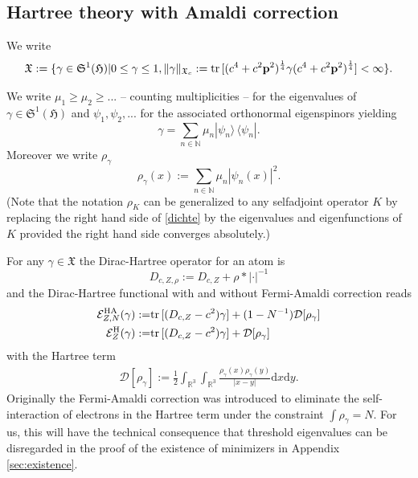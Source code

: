 \documentclass[a4paper]{amsart}
\def\tr{{\rm tr \,}}
\def\R{\mathbb{R}}
\def\bp{{\mathbf p}}
\def\cD{\mathcal{D}}
\def\gH{\mathfrak{H}}
\def\gS{\mathfrak{S}}
\def\gX{\mathfrak{X}}
\def\rd{\mathrm{d}}
\def\nz{{\mathbb N}}
\begin{document}
\subsection{Hartree  theory with Amaldi correction} 
We write
\begin{equation}
\gX:=\{\gamma\in\gS^1({\gH})| 0\leq\gamma\leq1, \|\gamma\|_{\gX_c}:=\tr[(c^4+c^2\bp^2)^\frac14\gamma(c^4+c^2\bp^2)^\frac14]<\infty\}.
\end{equation}

We write $\mu_1\geq\mu_2\geq... $ -- counting multiplicities
-- for the eigenvalues of $\gamma\in \gS^1(\gH)$ and $\psi_1,\psi_2,...$ for
the associated orthonormal eigenspinors yielding
\begin{equation}
  \gamma=\sum_{n\in \nz}\mu_n |\psi_n \rangle\,\langle \psi_n|.
\end{equation}
Moreover we write $\rho_\gamma$
\begin{equation}
  \label{dichte}
\rho_{\gamma}(x):=\sum_{n\in\nz}\mu_n |\psi_n(x)|^2.
\end{equation}
(Note that the notation $\rho_K$ can be generalized to any selfadjoint
operator $K$ by replacing the right hand side of \eqref{dichte} by the
eigenvalues and eigenfunctions of $K$ provided the right hand side
converges absolutely.)

For any $\gamma\in\gX$ the Dirac-Hartree operator for an atom is
\begin{equation}
    D_{c,Z,\rho}:= D_{c,Z}+\rho*|\cdot|^{-1}
\end{equation}
and the Dirac-Hartree functional with and without Fermi-Amaldi
correction reads 
\begin{align}
  \mathcal{E}^{\rm HA}_{Z,N}(\gamma):=&\tr[(D_{c,Z}-c^2)\gamma]+(1-N^{-1})\cD[\rho_{\gamma}]\\
  \mathcal{E}^{\rm H}_Z(\gamma):=&\tr[(D_{c,Z}-c^2)\gamma]+\cD[\rho_{\gamma}]
\end{align}
with the Hartree term 
\begin{align*}
    \cD[\rho_{\gamma}]:= \tfrac12\int_{\R^3}\int_{\R^3}\frac{\rho_{\gamma}(x)\rho_{\gamma}(y)}{|x-y|}\rd x \rd y.
\end{align*}
Originally the Fermi-Amaldi correction \cite{FermiAmaldi1934} was
introduced to eliminate the self-interaction of electrons in the
Hartree term under the constraint $\int\rho_\gamma=N$. For us,
this will have the technical consequence that threshold eigenvalues
can be disregarded in the proof of the existence of minimizers in
Appendix \ref{sec:existence}.
\end{document}
